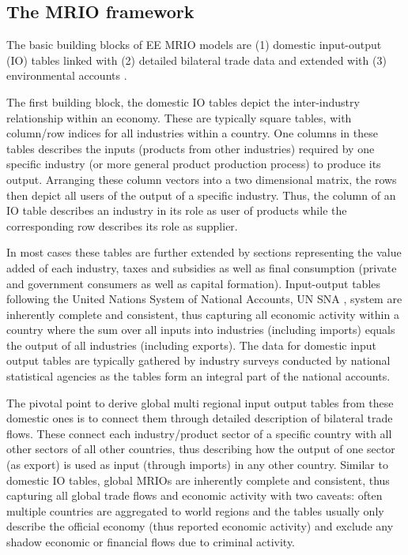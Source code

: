 \documentclass{jors}
\begin{document}
{\subsection*{The MRIO framework}


The basic building blocks of EE MRIO models are (1) domestic input-output (IO) tables linked with (2) detailed bilateral trade data and extended with (3) environmental accounts \cite{wiedmann2011_Quo}.

The first building block, the domestic IO tables depict the inter-industry relationship within an economy. 
These are typically square tables, with column/row indices for all industries within a country.
One columns in these tables describes the inputs (products from other industries) required by one specific industry (or more general product production process) to produce its output. 
Arranging these column vectors into a two dimensional matrix, the rows then depict all users of the output of a specific industry. 
Thus, the column of an IO table describes an industry in its role as user of products while the corresponding row describes its role as supplier.

In most cases these tables are further extended by sections representing the value added of each industry, taxes and subsidies as well as final consumption (private and government consumers as well as capital formation).
Input-output tables following the United Nations System of National Accounts, UN SNA \cite{unitednations2009_System}, system are inherently complete and consistent, thus capturing all economic activity within a country where the sum over all inputs into industries (including imports) equals the output of all industries (including exports). 
The data for domestic input output tables are typically gathered by industry surveys conducted by national statistical agencies as the tables form an integral part of the national accounts. 

The pivotal point to derive global multi regional input output tables from these domestic ones is to connect them through detailed description of bilateral trade flows. 
These connect each industry/product sector of a specific country with all other sectors of all other countries, thus describing how the output of one sector (as export) is used as input (through imports) in any other country. 
Similar to domestic IO tables, global MRIOs are inherently complete and consistent, thus capturing all global trade flows and economic activity with two caveats: often multiple countries are aggregated to world regions and the tables usually only describe the official economy (thus reported economic activity) and exclude any shadow economic or financial flows due to criminal activity.

}
\end{document}
